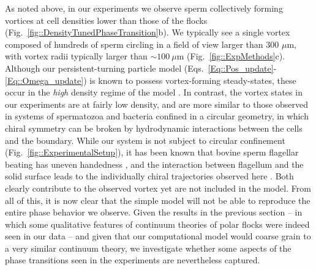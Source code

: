 \documentclass[reprint,unsortedaddress,amsmath,amssymb,aps,pre]{revtex4-2}
\begin{document}
As noted above, in our experiments we observe sperm collectively forming vortices at cell densities lower than those of the flocks (Fig.~\ref{fig::DensityTunedPhaseTransition}b). We typically see a single vortex composed of hundreds of sperm circling in a field of view larger than 300 $\mu$m, with vortex radii typically larger than $\sim 100\ \mu$m (Fig.~\ref{fig::ExpMethods}c). Although our persistent-turning particle model (Eqs.~\ref{Eq::Pos_update}-\ref{Eq::Omega_update}) is known to possess vortex-forming steady-states, these occur in the \emph{high} density regime of the model \cite{nagai2015collective}. In contrast, the vortex states in our experiments are at fairly low density, and are more similar to those observed in systems of spermatozoa \cite{creppy2016symmetry} and bacteria \cite{wioland2013confinement} confined in a circular geometry, in which chiral symmetry can be broken by hydrodynamic interactions between the cells and the boundary. While our system is not subject to circular confinement (Fig.~\ref{fig::ExperimentalSetup}), it has been known that bovine sperm flagellar beating has uneven handedness \cite{Ishijima1992Rotational}, and the interaction between flagellum and the solid surface leads to the individually chiral trajectories observed here \cite{Friedrich2010high}. Both clearly contribute to the observed vortex yet are not included in the model. From all of this, it is now clear that the simple model will not be able to reproduce the entire phase behavior we observe. Given the results in the previous section -- in which some qualitative features of continuum theories of polar flocks were indeed seen in our data  -- and given that our computational model would coarse grain to a very similar continuum theory, we investigate whether some aspects of the phase transitions seen in the experiments are nevertheless captured.
\end{document}
